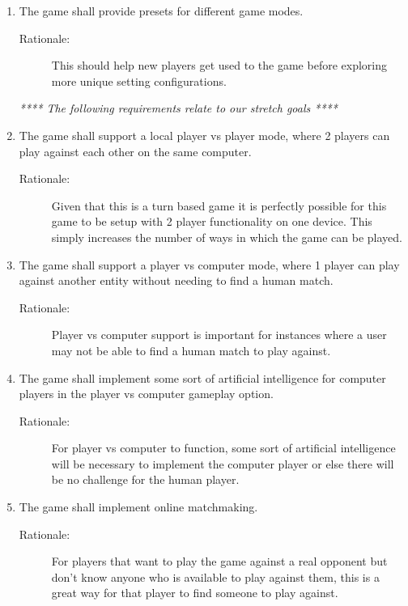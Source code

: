 \begin{enumerate}[label=R\arabic*, start=1, left=0pt]
    \item The game shall provide presets for different game modes.
    \begin{description}
        \item[Rationale:] This should help new players get used to the game before exploring more unique setting configurations.
    \end{description}

    \textit{**** The following requirements relate to our stretch goals ****}
    \item The game shall support a local player vs player mode, where 2 players can play against each other on the same computer.
    \begin{description}
        \item[Rationale:] Given that this is a turn based game it is perfectly possible for this game to be setup with 2 player functionality on one device. This simply increases the number of ways in which the game can be played.
    \end{description}

    \item The game shall support a player vs computer mode, where 1 player can play against another entity without needing to find a human match.
    \begin{description}
        \item[Rationale:] Player vs computer support is important for instances where a user may not be able to find a human match to play against.
    \end{description}

    \item The game shall implement some sort of artificial intelligence for computer players in the player vs computer gameplay option.
    \begin{description}
        \item[Rationale:] For player vs computer to function, some sort of artificial intelligence will be necessary to implement the computer player or else there will be no challenge for the human player.
    \end{description}

    \item The game shall implement online matchmaking.
    \begin{description}
        \item[Rationale:] For players that want to play the game against a real opponent but don't know anyone who is available to play against them, this is a great way for that player to find someone to play against.
    \end{description}


\end{enumerate}
